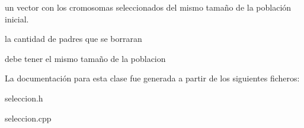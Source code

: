 \begin{DoxyVerb}  \return un vector con los cromosomas seleccionados del mismo tamaño de la población inicial.\end{DoxyVerb}
 la cantidad de padres que se borraran

debe tener el mismo tamaño de la poblacion 

La documentación para esta clase fue generada a partir de los siguientes ficheros\-:\begin{DoxyCompactItemize}
\item 
seleccion.\-h\item 
seleccion.\-cpp\end{DoxyCompactItemize}
